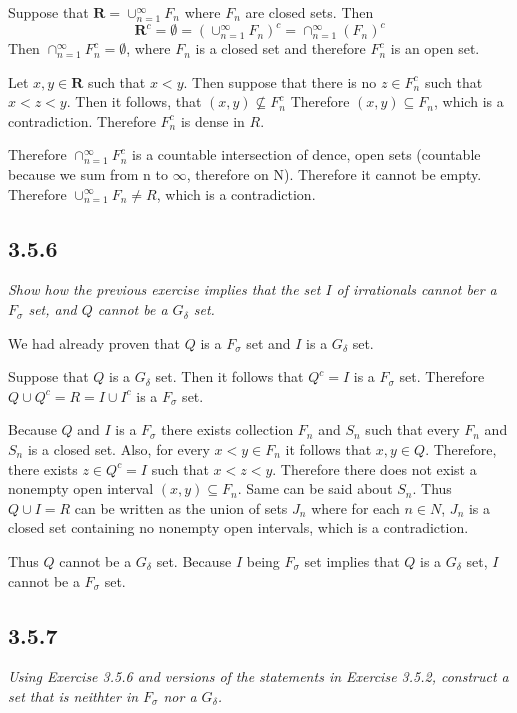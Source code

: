 \documentclass[11pt,oneside,titlepage]{book}
\begin{document}
Suppose that $\textbf{R} = \cup_{n = 1}^{\infty}F_n$ where $F_n$ are closed
sets. Then 
$$\textbf{R}^c = \emptyset = (\cup_{n = 1}^{\infty}F_n)^c =
\cap_{n = 1}^{\infty}(F_n)^c$$
Then $\cap_{n = 1}^{\infty}F_n^c = \emptyset $, where $F_n$ is a closed
set and therefore $F_n^c$ is an open set.

Let  $x,y \in \textbf{R} $ such that $x < y$. Then suppose that
there is no $z \in F_n^c$ such that $x < z < y$. Then it follows, that
$(x, y) \not \subseteq F_n^c$ Therefore $(x, y) \subseteq F_n$, which is a
contradiction. Therefore $F_n^c$ is dense in $R$.

Therefore $\cap_{n = 1}^{\infty}F_n^c$ is a countable intersection of dence,
open sets (countable because we sum from n to $\infty$, therefore on N).
Therefore it cannot be empty. Therefore $\cup_{n = 1}^{\infty}F_n \neq R$,
which is a contradiction.

\subsection*{3.5.6}
\textit{Show how the previous exercise implies that the set $I$ of irrationals
  cannot ber a $F_\sigma$ set, and $Q$ cannot be a $G_\delta$ set.}

We had already proven that $Q$ is a $F_\sigma$ set and $I$ is a
$G_\delta$ set. 

Suppose that $Q$ is a $G_\delta$ set. Then it follows that $Q^c = I$ is a
$F_\sigma$ set. Therefore $Q \cup Q^c = R = I \cup I^c$ is a $F_\sigma$ set.

Because $Q$ and $I$ is a $F_\sigma$ there exists collection $F_n$ and $S_n$
such that every $F_n$ and $S_n$ is a closed set. Also, for every
$x < y \in F_n$  it follows that $x, y \in Q$. Therefore, there exists
$z \in Q^c = I$ such that $x < z < y$. Therefore there does not exist
a nonempty open interval $(x, y) \subseteq F_n$. Same can be said
about $S_n$. Thus $Q \cup I = R$ can be written as the union of sets
$J_n$ where for each $n \in N$, $J_n$ is a closed set containing no nonempty
open intervals, which is a contradiction.

Thus $Q$ cannot be a $G_\delta$ set. Because  $I$ being $F_\sigma$ set implies
that $Q$ is a $G_\delta$ set, $I$ cannot be a $F_\sigma$ set.


\subsection*{3.5.7}
\textit{Using Exercise 3.5.6 and versions of the statements in Exercise 3.5.2,
  construct a set that is neithter in $F_\sigma$ nor a $G_\delta$.}
\end{document}
